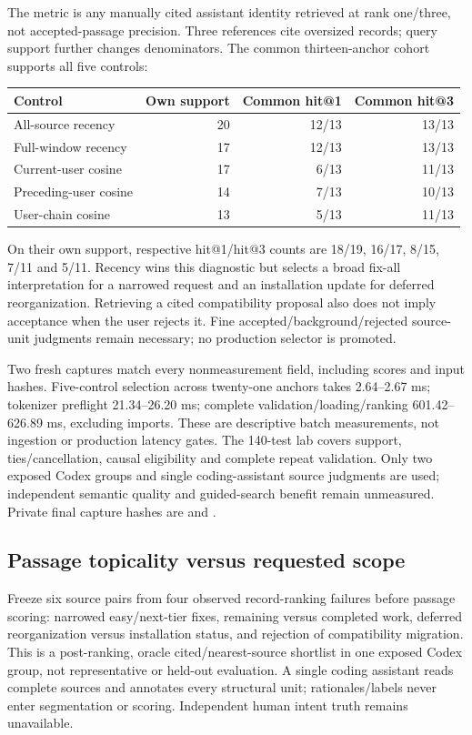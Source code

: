\documentclass[11pt]{article}
\begin{document}
The metric is any manually cited assistant identity retrieved at rank one/three,
not accepted-passage precision. Three references cite oversized records; query
support further changes denominators. The common thirteen-anchor cohort supports
all five controls:
\begin{center}
\begin{tabular}{lrrr}
\hline
Control & Own support & Common hit@1 & Common hit@3 \\
\hline
All-source recency & 20 & 12/13 & 13/13 \\
Full-window recency & 17 & 12/13 & 13/13 \\
Current-user cosine & 17 & 6/13 & 11/13 \\
Preceding-user cosine & 14 & 7/13 & 10/13 \\
User-chain cosine & 13 & 5/13 & 11/13 \\
\hline
\end{tabular}
\end{center}
On their own support, respective hit@1/hit@3 counts are 18/19, 16/17, 8/15,
7/11 and 5/11. Recency wins this diagnostic but selects a broad fix-all
interpretation for a narrowed request and an installation update for deferred
reorganization. Retrieving a cited compatibility proposal also does not imply
acceptance when the user rejects it. Fine accepted/background/rejected source-unit
judgments remain necessary; no production selector is promoted.

Two fresh captures match every nonmeasurement field, including scores and input
hashes. Five-control selection across twenty-one anchors takes 2.64--2.67 ms;
tokenizer preflight 21.34--26.20 ms; complete validation/loading/ranking
601.42--626.89 ms, excluding imports. These are descriptive batch measurements,
not ingestion or production latency gates. The 140-test lab covers support,
ties/cancellation, causal eligibility and complete repeat validation.
Only two exposed Codex groups and single coding-assistant source judgments are
used; independent semantic quality and guided-search benefit remain unmeasured.
Private final capture hashes are
and .

\subsection{Passage topicality versus requested scope}
Freeze six source pairs from four observed record-ranking failures before passage
scoring: narrowed easy/next-tier fixes, remaining versus completed work, deferred
reorganization versus installation status, and rejection of compatibility migration.
This is a post-ranking, oracle cited/nearest-source shortlist in one exposed Codex
group, not representative or held-out evaluation. A single coding assistant reads
complete sources and annotates every structural unit; rationales/labels never enter
segmentation or scoring. Independent human intent truth remains unavailable.
\end{document}

